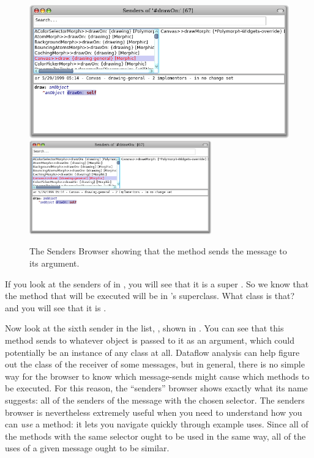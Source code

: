 \documentclass[a4paper,10pt,twoside]{book}
\begin{document}
\begin{figure}[htbp]
	\begin{center}
   \ifluluelse
		{\includegraphics[width=\textwidth]{CanvasDraw}}
		{\includegraphics[width=0.7\textwidth]{CanvasDraw}}
	\end{center}
	\caption{The Senders Browser showing that the  method sends the  message to its argument.	}
\end{figure}

If you look at the senders of  in , you will see that it is a super .  So we know that the method that will be executed will be in 's superclass.  What class is that?  \Actclick ~  and you will see that it is . 

Now look at the sixth sender in the list, , shown in .
You can see that this method sends  to whatever object is passed to it as an argument, which could potentially be an instance of any class at all.  
Dataflow analysis can help figure out the class of the receiver of some messages, but in general, there is no simple way for the browser to know which message-sends might cause which methods to be executed.
For this reason,  the ``senders'' browser shows exactly what its name suggests: all of the senders of the message with the chosen selector.  
The senders browser is nevertheless extremely useful when you need to understand how you can \emph{use} a method: it lets you navigate quickly through example uses.  
Since all of the methods with the same selector ought to be used in the same way, all of the uses of a given message ought to be similar.
\end{document}
